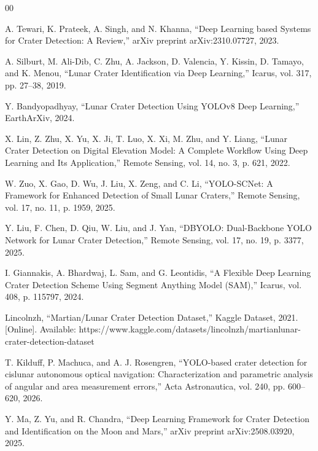\documentclass[conference]{IEEEtran}
\begin{document}
	\begin{thebibliography}{00}
		
		A. Tewari, K. Prateek, A. Singh, and N. Khanna,
		``Deep Learning based Systems for Crater Detection: A Review,''
		arXiv preprint arXiv:2310.07727, 2023.
		
		A. Silburt, M. Ali-Dib, C. Zhu, A. Jackson,
		D. Valencia, Y. Kissin, D. Tamayo, and K. Menou,
		``Lunar Crater Identification via Deep Learning,''
		Icarus, vol. 317, pp. 27--38, 2019.
		
		Y. Bandyopadhyay,
		``Lunar Crater Detection Using YOLOv8 Deep Learning,''
		EarthArXiv, 2024.
		
		X. Lin, Z. Zhu, X. Yu, X. Ji, T. Luo,
		X. Xi, M. Zhu, and Y. Liang,
		``Lunar Crater Detection on Digital Elevation Model:
		A Complete Workflow Using Deep Learning and Its Application,''
		Remote Sensing, vol. 14, no. 3, p. 621, 2022.
		
		W. Zuo, X. Gao, D. Wu, J. Liu,
		X. Zeng, and C. Li,
		``YOLO-SCNet: A Framework for Enhanced Detection of Small Lunar Craters,''
		Remote Sensing, vol. 17, no. 11, p. 1959, 2025.
		
		Y. Liu, F. Chen, D. Qiu,
		W. Liu, and J. Yan,
		``DBYOLO: Dual-Backbone YOLO Network for Lunar Crater Detection,''
		Remote Sensing, vol. 17, no. 19, p. 3377, 2025.
		
		I. Giannakis, A. Bhardwaj, L. Sam,
		and G. Leontidis,
		``A Flexible Deep Learning Crater Detection Scheme Using Segment Anything Model (SAM),''
		Icarus, vol. 408, p. 115797, 2024.
		
		Lincolnzh,
		``Martian/Lunar Crater Detection Dataset,''
		Kaggle Dataset, 2021.
		[Online]. Available:
		https://www.kaggle.com/datasets/lincolnzh/martianlunar-crater-detection-dataset
		
		T. Kilduff, P. Machuca,
		and A. J. Rosengren,
		``YOLO-based crater detection for cislunar autonomous optical navigation:
		Characterization and parametric analysis of angular and area measurement errors,''
		Acta Astronautica, vol. 240, pp. 600--620, 2026.
		
		Y. Ma, Z. Yu, and R. Chandra,
		``Deep Learning Framework for Crater Detection and Identification on the Moon and Mars,''
		arXiv preprint arXiv:2508.03920, 2025.
		
	\end{thebibliography}
	
\end{document}
